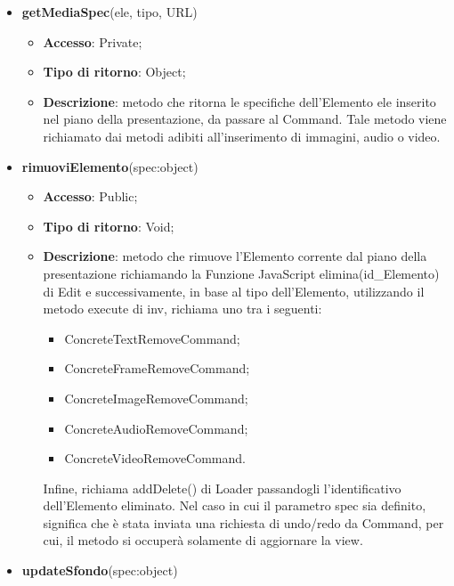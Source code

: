 {{\begin{itemize}
\begin{itemize}
\begin{itemize}
					\item ConcreteAudioInsertCommand;
					\item ConcreteVideoInsertCommand.
				\end{itemize}
				Infine, richiama addInsert() di Loader passandogli l'identificativo del video inserito.
			\end{itemize}
			\item \textbf{getMediaSpec}(ele, tipo, URL)
			\begin{itemize}
				\item \textbf{Accesso}: Private;
				\item \textbf{Tipo di ritorno}: Object;
				\item \textbf{Descrizione}: metodo che ritorna le specifiche dell'Elemento ele inserito nel piano della presentazione, da passare al Command. Tale metodo viene richiamato dai metodi adibiti all'inserimento di immagini, audio o video.
			\end{itemize}
			\item \textbf{rimuoviElemento}(spec:object)
			\begin{itemize}
				\item \textbf{Accesso}: Public;
				\item \textbf{Tipo di ritorno}: Void;
				\item \textbf{Descrizione}: metodo che rimuove l'Elemento corrente dal piano della presentazione richiamando la Funzione\ped{g} JavaScript elimina(id\_Elemento) di Edit e successivamente, in base al tipo dell'Elemento, utilizzando il metodo execute di inv, richiama uno tra i seguenti:
				\begin{itemize}
					\item ConcreteTextRemoveCommand;
					\item ConcreteFrameRemoveCommand;
					\item ConcreteImageRemoveCommand;
					\item ConcreteAudioRemoveCommand;
					\item ConcreteVideoRemoveCommand.
				\end{itemize}
				 Infine, richiama addDelete() di Loader passandogli l'identificativo dell'Elemento eliminato. Nel caso in cui il parametro spec sia definito, significa che è stata inviata una richiesta di undo/redo da Command, per cui, il metodo si occuperà solamente di aggiornare la view.
			\end{itemize}
			\item \textbf{updateSfondo}(spec:object)

\end{itemize}}}
